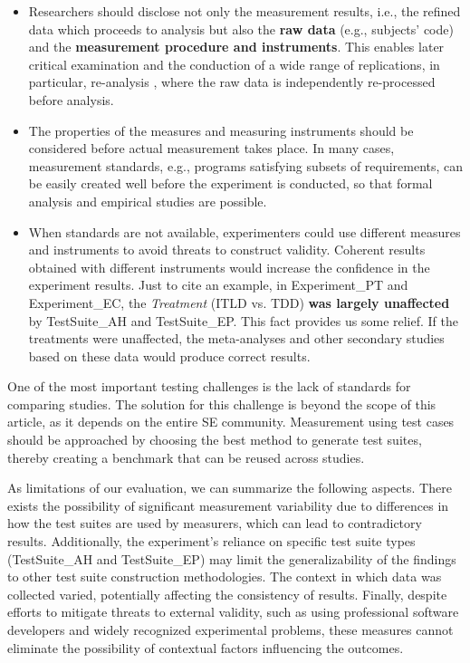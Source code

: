 \begin{itemize}

\item Researchers should disclose not only the measurement results, i.e., the refined data which proceeds to analysis but also the \textbf{raw data} (e.g., subjects' code) and the \textbf{measurement procedure and instruments}. This enables later critical examination and the conduction of a wide range of replications, in particular, re-analysis \cite{mittelstaedt1984econometric,IJzendoorn1994}, where the raw data is independently re-processed before analysis. 

\item The properties of the measures and measuring instruments should be considered before actual measurement takes place. In many cases, measurement standards, e.g., programs satisfying subsets of requirements, can be easily created well before the experiment is conducted, so that formal analysis and empirical studies are possible.

\item When standards are not available, experimenters could use different measures and instruments to avoid threats to construct validity. Coherent results obtained with different instruments would increase the confidence in the experiment results. Just to cite an example, in Experiment\_PT and Experiment\_EC, the \textit{Treatment} (ITLD vs. TDD) \textbf{was largely unaffected} by TestSuite\_AH and TestSuite\_EP. This fact provides us some relief. If the treatments were unaffected, the meta-analyses and other secondary studies based on these data would produce correct results.

\end{itemize}

One of the most important testing challenges is the lack of standards for comparing studies. The solution for this challenge is beyond the scope of this article, as it depends on the entire SE community. Measurement using test cases should be approached by choosing the best method to generate test suites, thereby creating a benchmark that can be reused across studies.

As limitations of our evaluation, we can summarize the following aspects. There exists the possibility of significant measurement variability due to differences in how the test suites are used by measurers, which can lead to contradictory results. Additionally, the experiment's reliance on specific test suite types (TestSuite\_AH and TestSuite\_EP) may limit the generalizability of the findings to other test suite construction methodologies. The context in which data was collected varied, potentially affecting the consistency of results. Finally, despite efforts to mitigate threats to external validity, such as using professional software developers and widely recognized experimental problems, these measures cannot eliminate the possibility of contextual factors influencing the outcomes.

